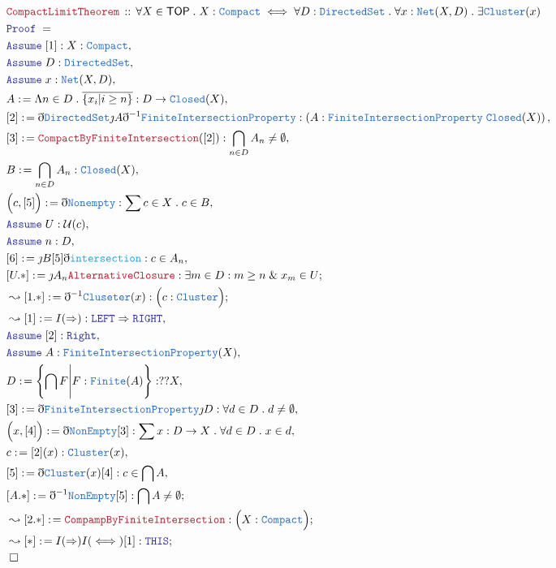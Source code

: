 \documentclass[12pt]{scrartcl}
\newcommand{\TYPE}[1]{\textcolor{NavyBlue}{\mathtt{#1}}}
\newcommand{\FUNC}[1]{\textcolor{Cerulean}{\mathtt{#1}}}
\newcommand{\LOGIC}[1]{\textcolor{Blue}{\mathtt{#1}}}
\newcommand{\THM}[1]{\textcolor{Maroon}{\mathtt{#1}}}
\renewcommand{\.}{\; . \;}
\newcommand{\de}{: \kern 0.1pc =}
\newcommand{\Theorem}[2]{& \THM{#1} \, :: \, #2 \\ & \Proof = \\ }
\newcommand{\Page}[1]{ \begin{align*} #1 \end{align*}   }
\newcommand{ \bd }{ \ByDef }
\renewcommand{\And}{\; \& \;}
\newcommand{\Imply}{\Rightarrow}
\newcommand{\Say}[3]{& #1 \de #2 : #3, \\}
\newcommand{\Conclude}[3]{& #1 \de #2 : #3; \\}
\newcommand{\Derive}[3]{& \leadsto #1 \de #2 : #3, \\}
\newcommand{\DeriveConclude}[3]{& \leadsto #1 \de #2 : #3 ; \\}
\newcommand{\Assume}[2]{& \LOGIC{Assume} \; #1 : #2, \\}
\newcommand{\QED}{\; \square}
\newcommand{\EndProof}{& \QED \\}
\newcommand{\ByDef}{\eth}
\newcommand{\ByConstr}{\jmath}
\newcommand{\Proof}{\LOGIC{Proof} \; }
\newcommand{\TOP}{\mathsf{TOP}}
\newcommand{\U}{\mathcal{U}}
\begin{document}
\Page{
	\Theorem{CompactLimitTheorem}
	{
		\forall X \in \TOP \.
		X : \TYPE{Compact} \iff
		\forall D : \TYPE{DirectedSet}	\.
		\forall x : \TYPE{Net}(X,D) \.
		\exists \TYPE{Cluster}(x)
	}
	\Assume{[1]}{X : \TYPE{Compact}}
	\Assume{D}{\TYPE{DirectedSet}}
	\Assume{x}{\TYPE{Net}(X,D)}
	\Say{A}{\Lambda n \in D \. \overline{\{ x_i | i \ge n \}}}{ D \to \TYPE{Closed}(X)  } 
	\Say{[2]}{\bd \TYPE{DirectedSet}\ByConstr A \bd^{-1} \TYPE{FiniteIntersectionProperty}}
	{
		\left( A : \TYPE{FiniteIntersectionProperty}\; \TYPE{Closed}(X)   \right) 
	}
	\Say{[3]}{\THM{CompactByFiniteIntersection}([2])}
	{
		\bigcap_{n \in D} A_n \neq \emptyset
	}
	\Say{B}{\bigcap_{n \in D} A_n}{\TYPE{Closed}(X)}
	\Say{\Big(c,[5]\Big)}{\bd \TYPE{Nonempty}}{\sum c \in X \. c \in B }
	\Assume{U}{\U(c)}
	\Assume{n}{D}
	\Say{[6]}{\ByConstr B [5] \bd \FUNC{intersection}}
	{
		c \in A_n
	}
	\Conclude{[U.*]}{\ByConstr A_n\THM{AlternativeClosure}}
	{
		\exists m \in D : m \ge n \And x_m \in U
	}
	\DeriveConclude{[1.*]}{\bd^{-1} \TYPE{Cluseter}(x)}{\Big( c : \TYPE{Cluster}\Big)}
	\Derive{[1]}{I(\Imply)}{ \LOGIC{LEFT} \Imply  \LOGIC{RIGHT} }
	\Assume{[2]}{\LOGIC{Right}}
	\Assume{A}{\TYPE{FiniteIntersectionProperty}(X)}
	\Say{D}{\left\{ \bigcap F \Bigg|  F : \TYPE{Finite}(A)  \right\}}{??X}
	\Say{[3]}{\bd \TYPE{FiniteIntersectionProperty}\ByConstr D}
	{
		\forall d \in D \. d \neq \emptyset
	}
	\Say{\Big( x, [4] \Big)}{\bd \TYPE{NonEmpty}[3]}
	{
		\sum x : D \to X \. \forall d \in D \. x \in d
	}
	\Say{c}{[2](x)}{\TYPE{Cluster}(x)}
	\Say{[5]}{\bd \TYPE{Cluster}(x)[4]}{c \in \bigcap A } 
	\Conclude{[A.*]}{\bd^{-1} \TYPE{NonEmpty}[5]}{\bigcap A \neq \emptyset}
	\DeriveConclude{[2.*]}{\THM{CompampByFiniteIntersection}}{\Big( X : \TYPE{Compact}  \Big)}
	\DeriveConclude{[*]}{I(\Imply)I(\iff)[1]}{\LOGIC{THIS}}
	\EndProof
}
\newpage
\end{document}
